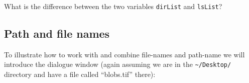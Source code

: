 What is the difference between the two variables \lstinline{dirList} and \lstinline{lsList}?

\subsection{Path and file names}
To illustrate how to work with and combine file-names and path-name we will introduce the dialogue window (again assuming we are in the \lstinline{~/Desktop/} directory and have a file called ``blobs.tif'' there):
